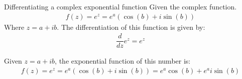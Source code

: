 \begin{theorem}{Differentiating a complex exponential function}{}
Given the complex function.
\begin{align}
f(z)=e^{z}=e^{a}(\cos(b)+i\sin(b))
\end{align}
Where $z=a+ib$. The differentiation of this function is given by:
\begin{align}
\dfrac{d}{dz}e^{z}=e^{z}
\end{align}
\end{theorem}
\begin{prof}{}{}
Given $z=a+ib$, the exponential function of this number is:
\begin{align}
f(z)=e^{z}=e^{a}(\cos(b)+i\sin(b))=e^{a}\cos(b)+e^{a}i\sin(b)
\end{align}
\end{prof}

